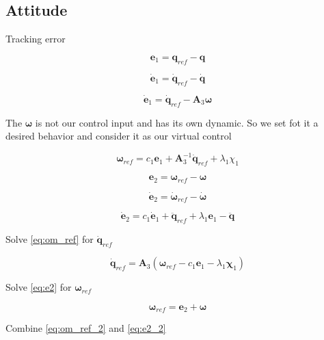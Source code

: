\subsection{Attitude}
Tracking error

\[
\mathbf{e}_1 = \mathbf{q}_{ref} - \mathbf{q}
\]

\[
\dot{\mathbf{e}}_1 = \dot{\mathbf{q}}_{ref} - \dot{\mathbf{q}}
\]

\begin{equation}
\dot{\mathbf{e}}_1 = \dot{\mathbf{q}}_{ref} - \mathbf{A}_3 \boldsymbol\omega
\label{eq:e1_dyn}
\end{equation}

The $\boldsymbol\omega$ is not our control input and has its own dynamic.
So we set fot it a desired behavior and consider it as our virtual control

\begin{equation}
\boldsymbol\omega_{ref} = c_1 \mathbf{e}_1 + \mathbf{A}_3^{-1} \dot{\mathbf{q}}_{ref} + \lambda_1 \chi_1
\label{eq:om_ref}
\end{equation}

\begin{equation}
\mathbf{e}_2 = \boldsymbol\omega_{ref} - \boldsymbol\omega
\label{eq:e2}
\end{equation}

\[
\dot{\mathbf{e}}_2 = \dot{\boldsymbol\omega}_{ref} - \dot{\boldsymbol\omega}
\]

\begin{equation}
\dot{\mathbf{e}}_2 = c_1 \dot{\mathbf{e}}_1 + \ddot{\mathbf{q}}_{ref} + \lambda_1 \mathbf{e}_1 - \ddot{\mathbf{q}}
\label{eq:e2_dyn}
\end{equation}



Solve \eqref{eq:om_ref} for $\dot{\mathbf{q}}_{ref}$

\begin{equation}
\dot{\mathbf{q}}_{ref} = \mathbf{A}_3 \left( \boldsymbol\omega_{ref} - c_1 \mathbf{e}_1 - \lambda_1 \boldsymbol\chi_1 \right)
\label{eq:om_ref_2}
\end{equation}

Solve \eqref{eq:e2} for $\boldsymbol\omega_{ref}$

\begin{equation}
\boldsymbol\omega_{ref} = \mathbf{e}_2 + \boldsymbol\omega
\label{eq:e2_2}
\end{equation}

Combine \eqref{eq:om_ref_2} and \eqref{eq:e2_2}

